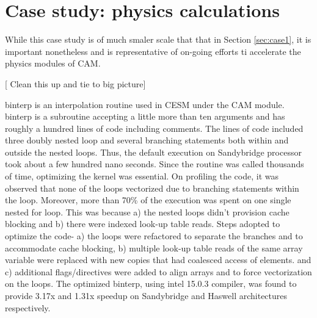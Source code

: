 \section{Case study: physics calculations}\label{sec:phys}

While this case study is of much smaler scale that that in Section \ref{sec:case1}, it is important nonetheless and is representative of on-going efforts ti accelerate the physics modules of CAM.


[{\color{red} Clean this up and tie to big picture}]

binterp is an interpolation routine used in CESM under the CAM module. binterp is a subroutine accepting a little more than ten arguments and has roughly a hundred lines of code including comments. The  lines of code included three doubly nested loop and several branching statements both within and outside the nested loops. Thus, the default execution on Sandybridge processor took about a few hundred nano seconds. Since the routine was called thousands of time, optimizing the kernel was essential.
On profiling the code, it was observed that none of the loops vectorized due to branching statements within the loop. Moreover, more than 70\% of the execution was spent on one single nested for loop. This was because a) the nested loops didn't provision cache blocking and b) there were indexed look-up table reads. Steps adopted to optimize the code- a) the loops were refactored to separate the branches and to accommodate cache blocking, b) multiple look-up table reads of the same array variable were replaced with new copies that had coalesced access of elements. and c) additional flags/directives were added to align arrays and to force vectorization on the loops. 
The optimized binterp, using intel 15.0.3 compiler, was found to provide 3.17x and 1.31x speedup on Sandybridge and Haswell architectures respectively. 

